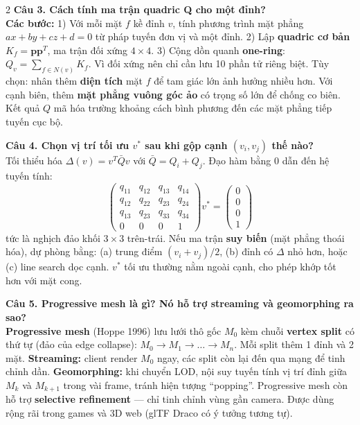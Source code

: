 \begin{paracol}{2}
\textbf{Câu 3. Cách tính ma trận quadric Q cho một đỉnh?}\\
\textbf{Các bước:} 1) Với mỗi mặt $f$ kề đỉnh $v$, tính phương trình mặt phẳng $ax+by+cz+d=0$ từ pháp tuyến đơn vị và một đỉnh. 2) Lập \textbf{quadric cơ bản} $K_f=\mathbf{p}\mathbf{p}^T$, ma trận đối xứng $4\times 4$. 3) Cộng dồn quanh \textbf{one-ring}: $Q_v=\sum_{f\in N(v)} K_f$. Vì đối xứng nên chỉ cần lưu 10 phần tử riêng biệt. Tùy chọn: nhân thêm \textbf{diện tích} mặt $f$ để tam giác lớn ảnh hưởng nhiều hơn. Với cạnh biên, thêm \textbf{mặt phẳng vuông góc ảo} có trọng số lớn để chống co biên. Kết quả $Q$ mã hóa trường khoảng cách bình phương đến các mặt phẳng tiếp tuyến cục bộ.

\textbf{Câu 4. Chọn vị trí tối ưu $v^*$ sau khi gộp cạnh $(v_i,v_j)$ thế nào?}\\
Tối thiểu hóa $\Delta(v)=v^T \bar Q v$ với $\bar Q=Q_i+Q_j$. Đạo hàm bằng 0 dẫn đến hệ tuyến tính:
\[
\begin{pmatrix} q_{11}&q_{12}&q_{13}&q_{14}\\ q_{12}&q_{22}&q_{23}&q_{24}\\ q_{13}&q_{23}&q_{33}&q_{34}\\ 0&0&0&1\end{pmatrix} v^* = \begin{pmatrix}0\\0\\0\\1\end{pmatrix}
\]
tức là nghịch đảo khối $3\times 3$ trên-trái. Nếu ma trận \textbf{suy biến} (mặt phẳng thoái hóa), dự phòng bằng: (a) trung điểm $(v_i+v_j)/2$, (b) đỉnh có $\Delta$ nhỏ hơn, hoặc (c) line search dọc cạnh. $v^*$ tối ưu thường nằm ngoài cạnh, cho phép khớp tốt hơn với mặt cong.

\textbf{Câu 5. Progressive mesh là gì? Nó hỗ trợ streaming và geomorphing ra sao?}\\
\textbf{Progressive mesh} (Hoppe 1996) lưu lưới thô gốc $M_0$ kèm chuỗi \textbf{vertex split} có thứ tự (đảo của edge collapse): $M_0\to M_1\to\ldots\to M_n$. Mỗi split thêm 1 đỉnh và 2 mặt. \textbf{Streaming:} client render $M_0$ ngay, các split còn lại đến qua mạng để tinh chỉnh dần. \textbf{Geomorphing:} khi chuyển LOD, nội suy tuyến tính vị trí đỉnh giữa $M_k$ và $M_{k+1}$ trong vài frame, tránh hiện tượng ``popping''. Progressive mesh còn hỗ trợ \textbf{selective refinement} — chỉ tinh chỉnh vùng gần camera. Được dùng rộng rãi trong games và 3D web (glTF Draco có ý tưởng tương tự).


\end{paracol}
